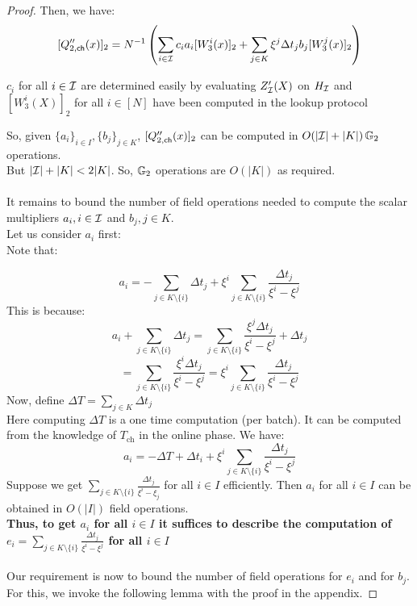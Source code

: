 \begin{proof}
    Then, we have:
    \begin{equation}\label{eq:Qcachepoly2commit}
    [Q''_{2,\mathsf{ch}}({x})]_2 = N^{-1}\left(\sum_{i\in\mathcal{I}}c_ia_i[W_3^i(x)]_2 + \sum_{j\in K}\xi^j \Delta t_j b_j [W_3^j(x)]_2\right)
    \end{equation}

    $c_i$ for all $i \in \mathcal{I}$ are determined easily by evaluating $Z_{\mathcal{I}}'(X)$ on $H_{\mathcal{I}}$ and $[W_3^i(X)]_2$ for all $i \in [N]$ have been computed in the lookup protocol

    So, given $\{a_i\}_{i\in I}, \{b_j\}_{j\in K}$, $[Q''_{2,\mathsf{ch}}({x})]_2$ can be computed in $O(|\mathcal{I}|+|K|)\, \mathbb{G}_2$ operations.\\
    But $|\mathcal{I}|+|K|<2|K|$. So, $\mathbb{G}_2$ operations are $O(|K|)$ as required.\\\\

    It remains to bound the number of field operations needed to compute the scalar multipliers $a_i, i \in \mathcal{I}$ and $b_j, j \in K$. \\

    Let us consider $a_i$ first:\\
    Note that:

    $$ a_i = -\sum_{j\in K\setminus \{i\}}\Delta t_j + \xi^i\sum_{j\in K\setminus \{i\}}\frac{\Delta t_j}{\xi^i-\xi^j} $$
    This is because:
    $$a_i+\sum_{j\in K\setminus \{i\}}\Delta t_j= \sum_{j \in K \setminus \{i\}}\frac{\xi^j\Delta t_j}{\xi^i-\xi^j}+\Delta t_j$$
    $$=\sum_{j \in K \setminus \{i\}}\frac{\xi^i\Delta t_j}{\xi^i-\xi^j} = \xi^i\sum_{j\in K\setminus \{i\}}\frac{\Delta t_j}{\xi^i-\xi^j}$$
    Now, define $\Delta T=\sum_{j\in K}\Delta t_j$\\

    Here computing $\Delta T$ is a one time computation (per batch). It can be computed from the knowledge of $T_{\text{ch}}$ in the online phase.
    We have:
    $$ a_i = -\Delta T + \Delta t_i + \xi^i\sum_{j\in K\setminus\{i\}}\frac{\Delta t_j}{\xi^i-\xi^j} $$
    Suppose we get $\sum_{j\in K\setminus\{i\}}\frac{\Delta t_j}{\xi^i-\xi_j}$ for all $i \in I$ efficiently. Then $a_i$ for all $i \in I$ can be obtained in $O(|I|)$ field operations. \\
    \textbf{Thus, to get $a_i$ for all $i \in I$ it suffices to describe the computation of $e_i=\sum_{j\in K\setminus\{i\}}\frac{\Delta t_j}{\xi^i-\xi^j}$ for all $i \in I$}\\\\
    Our requirement is now to bound the number of field operations for $e_i$ and for $b_j$. For this, we invoke the following lemma with the proof in the appendix.


\end{proof}
